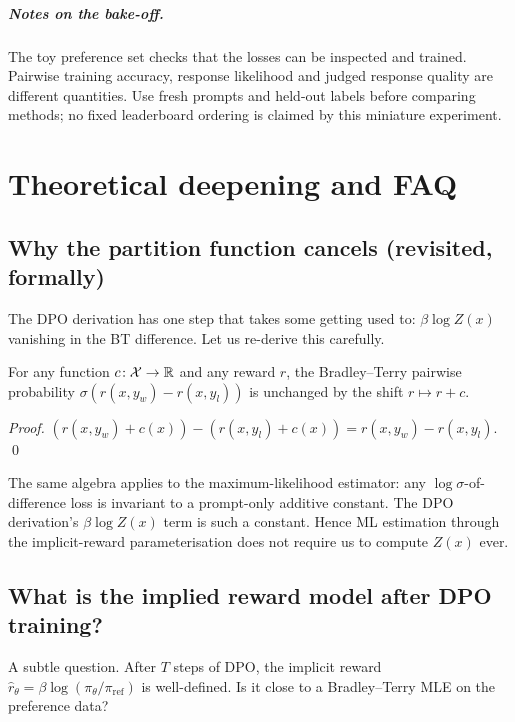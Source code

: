 \documentclass[11pt,oneside]{scrbook}
\begin{document}
\paragraph{Notes on the bake-off.} The toy preference set checks that the
losses can be inspected and trained. Pairwise training accuracy, response
likelihood and judged response quality are different quantities. Use fresh
prompts and held-out labels before comparing methods; no fixed leaderboard
ordering is claimed by this miniature experiment.

\chapter{Theoretical deepening and FAQ}

\section{Why the partition function cancels (revisited, formally)}

The DPO derivation has one step that takes some getting used to:
$\beta\log Z(x)$ vanishing in the BT difference. Let us re-derive
this carefully.

\begin{lemma}
\label{lem:bt-invariant}
For any function $c\!: \mathcal{X} \to \mathbb{R}$ and any reward $r$,
the Bradley--Terry pairwise probability $\sigma(r(x, y_w) - r(x, y_l))$
is unchanged by the shift $r \mapsto r + c$.
\end{lemma}
\begin{proof}
$(r(x, y_w) + c(x)) - (r(x, y_l) + c(x)) = r(x, y_w) - r(x, y_l)$. \qed
\end{proof}

The same algebra applies to the maximum-likelihood estimator: any
$\log\sigma$-of-difference loss is invariant to a prompt-only
additive constant. The DPO derivation's $\beta\log Z(x)$ term is
such a constant. Hence ML estimation through the implicit-reward
parameterisation does not require us to compute $Z(x)$ ever.

\section{What is the implied reward model after DPO training?}

A subtle question. After $T$ steps of DPO, the implicit reward
$\hat r_\theta = \beta\log(\pi_\theta / \pi_{\text{ref}})$ is well-defined.
Is it close to a Bradley--Terry MLE on the preference data?
\end{document}
